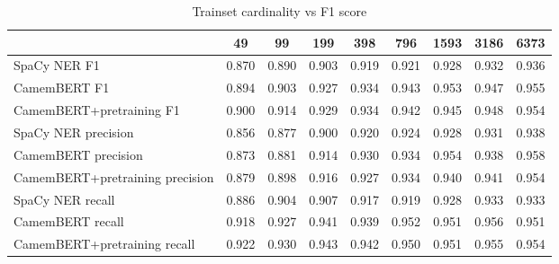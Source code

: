 \begin{table}[!h]

\caption{Trainset cardinality vs F1 score}
\centering
\begin{tabular}[t]{lcccccccc}
\toprule
  & 49 & 99 & 199 & 398 & 796 & 1593 & 3186 & 6373\\
\midrule
SpaCy NER F1 & 0.870 & 0.890 & 0.903 & 0.919 & 0.921 & 0.928 & 0.932 & 0.936\\
CamemBERT F1 & 0.894 & 0.903 & 0.927 & 0.934 & 0.943 & 0.953 & 0.947 & 0.955\\
CamemBERT+pretraining F1 & 0.900 & 0.914 & 0.929 & 0.934 & 0.942 & 0.945 & 0.948 & 0.954\\
SpaCy NER precision & 0.856 & 0.877 & 0.900 & 0.920 & 0.924 & 0.928 & 0.931 & 0.938\\
CamemBERT precision & 0.873 & 0.881 & 0.914 & 0.930 & 0.934 & 0.954 & 0.938 & 0.958\\
\addlinespace
CamemBERT+pretraining precision & 0.879 & 0.898 & 0.916 & 0.927 & 0.934 & 0.940 & 0.941 & 0.954\\
SpaCy NER recall & 0.886 & 0.904 & 0.907 & 0.917 & 0.919 & 0.928 & 0.933 & 0.933\\
CamemBERT recall & 0.918 & 0.927 & 0.941 & 0.939 & 0.952 & 0.951 & 0.956 & 0.951\\
CamemBERT+pretraining recall & 0.922 & 0.930 & 0.943 & 0.942 & 0.950 & 0.951 & 0.955 & 0.954\\
\bottomrule
\end{tabular}
\end{table}